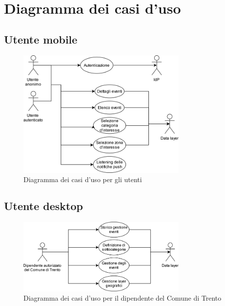 \documentclass{article}
\begin{document}
\clearpage

\section{Diagramma dei casi d'uso}

\subsection{Utente mobile}

\begin{figure}[htbp]
    \centering
    \includegraphics[width=0.75\textwidth]{Images/UseCase_Diagram - Utenti.png}
    \caption{Diagramma dei casi d'uso per gli utenti}
\end{figure}
\clearpage

\subsection{Utente desktop}

\begin{figure}[htbp]
    \centering
    \includegraphics[width=0.75\textwidth]{Images/UseCase_Diagram - Comune.png}
    \caption{Diagramma dei casi d'uso per il dipendente del Comune di Trento}
\end{figure}
\end{document}
